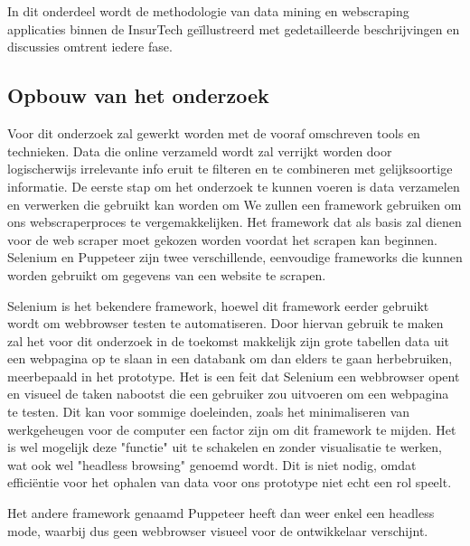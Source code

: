 
\chapter{}
\label{ch:methodologie}


In dit onderdeel wordt de methodologie van data mining en webscraping applicaties binnen de InsurTech geïllustreerd met gedetailleerde beschrijvingen en discussies omtrent iedere fase.

\section{Opbouw van het onderzoek}
Voor dit onderzoek zal gewerkt worden met de vooraf omschreven tools en technieken.
Data die online verzameld wordt zal verrijkt worden door logischerwijs irrelevante info eruit te filteren en te combineren met gelijksoortige informatie.
De eerste stap om het onderzoek te kunnen voeren is data verzamelen en verwerken die gebruikt kan worden om 
We zullen een framework gebruiken om ons webscraperproces te vergemakkelijken. Het framework dat als basis zal dienen voor de web scraper moet gekozen worden voordat het scrapen kan beginnen. Selenium en Puppeteer zijn twee verschillende, eenvoudige frameworks die kunnen worden gebruikt om gegevens van een website te scrapen.

Selenium is het bekendere framework, hoewel dit framework eerder gebruikt wordt om webbrowser testen te automatiseren. Door hiervan gebruik te maken zal het voor dit onderzoek in de toekomst makkelijk zijn grote tabellen data uit een webpagina op te slaan in een databank om dan elders te gaan herbebruiken, meerbepaald in het prototype. Het is een feit dat Selenium een webbrowser opent en visueel de taken nabootst die een gebruiker zou uitvoeren om een webpagina te testen. Dit kan voor sommige doeleinden, zoals het minimaliseren van werkgeheugen voor de computer een factor zijn om dit framework te mijden. Het is wel mogelijk deze "functie" uit te schakelen en zonder visualisatie te werken, wat ook wel "headless browsing" genoemd wordt. Dit is niet nodig, omdat efficiëntie voor het ophalen van data voor ons prototype niet echt een rol speelt. 

Het andere framework genaamd Puppeteer heeft dan weer enkel een headless mode, waarbij dus geen webbrowser visueel voor de ontwikkelaar verschijnt. 